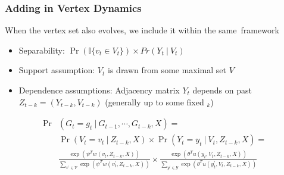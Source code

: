 \documentclass[10pt]{beamer}
\begin{document}
\begin{frame}

\frametitle{Adding in Vertex Dynamics}


\begin{block}{When the vertex set also evolves, we include it within the same~framework}
\begin{itemize}
\item Separability: $\Pr \left( \mathbb{I}\{ v_t \in V_t \} \right) \times Pr \left( Y_{t} \: | \: V_t \right)$
\item Support assumption: $V_t$ is drawn from some maximal set $V$
\item Dependence assumptions: Adjacency matrix $Y_t$ depends on past $Z_{t-k} = (Y_{t-k},V_{t-k})$ (generally up to some fixed ${}_k$)
\end{itemize}
\end{block}


\begin{block}{}
\begin{align*}
\Pr&(G_t=g_t \: | \: G_{t-1},\cdots,G_{t-k},X) =\\
 &\Pr(V_t =v_t \: | \: Z_{t-k}, X )\times \Pr(Y_t=y_t \: | \: V_{t}, Z_{t-k},X)=\\
&\frac{ \exp \left(\psi^T w(v_t,Z_{t-k},X) \right) }{\sum_{v^{'} \in \mathcal{V}} \exp \left(\psi^T w(v_t^{'},Z_{t-k},X) \right)}  \times \frac{ \exp \left(\theta^T u(y_t,V_t,Z_{t-k},X) \right) }{\sum_{y^{'} \in \mathcal{Y}} \exp \left(\theta^T u(y_t^{'},V_t,Z_{t-k},X) \right)}
\end{align*}
\end{block}
\end{frame}
\end{document}
